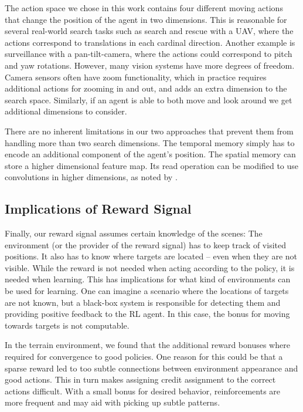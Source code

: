 The action space we chose in this work contains four different moving actions that change the position of the agent in two dimensions.
This is reasonable for several real-world search tasks such as search and rescue with a UAV, where the actions correspond to translations in each cardinal direction.
Another example is surveillance with a pan-tilt-camera, where the actions could correspond to pitch and yaw rotations.
However, many vision systems have more degrees of freedom.
Camera sensors often have zoom functionality, which in practice requires additional actions for zooming in and out, and adds an extra dimension to the search space.
Similarly, if an agent is able to both move and look around we get additional dimensions to consider.

There are no inherent limitations in our two approaches that prevent them from handling more than two search dimensions.
The temporal memory simply has to encode an additional component of the agent's position.
The spatial memory can store a higher dimensional feature map.
Its read operation can be modified to use convolutions in higher dimensions, as noted by \cite{parisotto_neural_2017}.

\subsection{Implications of Reward Signal}

Finally, our reward signal assumes certain knowledge of the scenes:
The environment (or the provider of the reward signal) has to keep track of visited positions.
It also has to know where targets are located -- even when they are not visible.
While the reward is not needed when acting according to the policy, it is needed when learning.
This has implications for what kind of environments can be used for learning.
One can imagine a scenario where the locations of targets are not known, but a black-box system is responsible for detecting them and providing positive feedback to the RL agent.
In this case, the bonus for moving towards targets is not computable.

In the terrain environment, we found that the additional reward bonuses where required for convergence to good policies.
One reason for this could be that a sparse reward led to too subtle connections between environment appearance and good actions.
This in turn makes assigning credit assignment to the correct actions difficult.
With a small bonus for desired behavior, reinforcements are more frequent and may aid with picking up subtle patterns.

